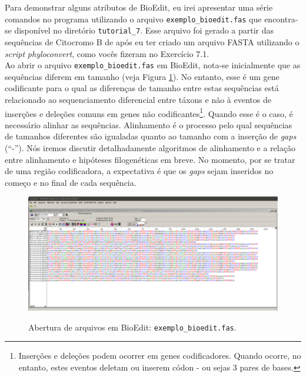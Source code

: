 \begin{refsection}

Para demonstrar alguns atributos de BioEdit, eu irei apresentar uma série comandos no programa utilizando o arquivo \texttt{exemplo\_bioedit.fas} que encontra-se disponível no diretório \texttt{tutorial\_7}. Esse arquivo foi gerado a partir das sequências de Citocromo B de \textcite{dias_et_al_2013} após eu ter criado um arquivo FASTA utilizando o \textit{script} \textit{phyloconvert}, como vocês fizeram no Exercício 7.1.\\

Ao abrir o arquivo \texttt{exemplo\_bioedit.fas} em BioEdit, nota-se inicialmente que as sequências diferem em tamanho (veja Figura \ref{tut7:fig:exemplo_1}). No entanto, esse é um gene codificante para o qual as diferenças de tamanho entre estas sequências está relacionado ao sequenciamento diferencial entre táxons e não à eventos de inserções e deleções comuns em genes não codificantes\footnote{Inserções e deleções podem ocorrer em genes codificadores. Quando ocorre, no entanto, estes eventos deletam ou inserem códon - ou sejas 3 pares de bases.}. Quando esse é o caso, é necessário alinhar as sequências. Alinhamento é o processo pelo qual sequências de tamanhos diferentes são igualadas quanto ao tamanho com a inserção de \textit{gaps} (``-''). Nós iremos discutir detalhadamente algoritmos de alinhamento e a relação entre alinhamento e hipóteses filogenéticas em breve. No momento, por se tratar de uma região codificadora, a expectativa é que os \textit{gaps} sejam inseridos no começo e no final de cada sequência.\\

  \begin{figure}[h!]
      {\includegraphics[scale=0.3]{figures/tut7/exemplo_bioedit_1.eps}}
	{\caption[Bioedit: abertura de arquivos]{Abertura de arquivos em BioEdit: \texttt{exemplo\_bioedit.fas}.}\label{tut7:fig:exemplo_1}}
  \end{figure}


\end{refsection}
